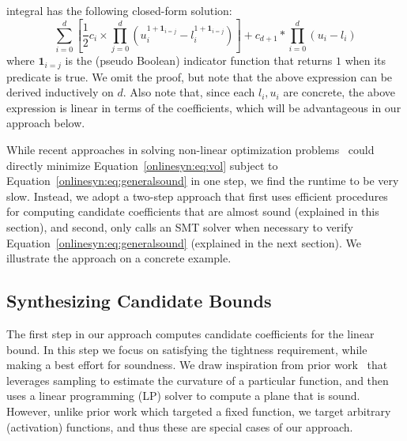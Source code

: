 integral has the following closed-form solution:
\begin{equation} \label{onlinesyn:eq:vol}
\sum_{i=0}^{d} \left[
\frac{1}{2}c_i \times \prod_{j=0}^{d}
\left(
u_i^{1 + \mathbf{1}_{i=j}} - l_i^{1 + \mathbf{1}_{i=j}}
\right)
\right] +
c_{d+1} * \prod_{i=0}^d (u_i - l_i)
\end{equation}
where $ \mathbf{1}_{i=j} $ is the (pseudo Boolean) indicator function that
returns $ 1 $ when its predicate is true.
%
We omit the proof, but note that the above expression can be
derived inductively on $ d $. Also note that, since each $ l_i, u_i $ are
concrete, the above expression is linear in terms of the coefficients, which
will be advantageous in our approach below.

While recent approaches in solving non-linear optimization
problems~\cite{kong2018delta,chabert2009contractor} could directly minimize
Equation~\ref{onlinesyn:eq:vol}
subject to Equation~\ref{onlinesyn:eq:generalsound} in one step, we find the
runtime to
be very slow. Instead, we adopt a two-step approach that
first uses efficient procedures for computing candidate coefficients that are
almost sound (explained in this section), and second, only calls an SMT
solver when necessary to verify Equation~\ref{onlinesyn:eq:generalsound}
(explained in
the next
section).
We illustrate the approach on a concrete example.


\subsection{Synthesizing Candidate Bounds}

The first step in our approach computes candidate coefficients for the linear
bound. In this step we focus on satisfying the tightness requirement, while
making a best effort for soundness. We draw inspiration from prior
work~\cite{ryou2021scalable,balunovic2019certifying} that leverages sampling to
estimate the curvature of a particular function, and then uses a linear
programming (LP) solver to compute a plane that is sound. However, unlike prior
work which targeted a fixed function, we target arbitrary (activation)
functions, and thus these are special cases of our approach.

